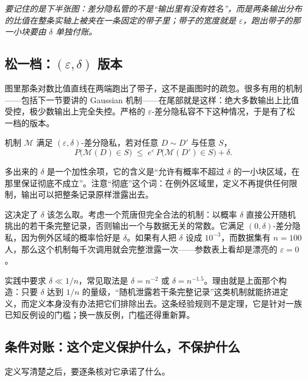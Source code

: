 \emph{要记住的是下半张图：差分隐私管的不是``输出里有没有姓名''，而是两条输出分布的比值在整条实轴上被夹在一条固定的带子里；带子的宽度就是 \(\varepsilon\)，跑出带子的那一小块要由 \(\delta\) 单独付账。}

\subsection{\texorpdfstring{松一档：\((\varepsilon,\delta)\) 版本}{松一档：(eps, delta) 版本}}

图里那条对数比值直线在两端跑出了带子，这不是画图时的疏忽。很多有用的机制——包括下一节要讲的 Gaussian 机制——在尾部就是这样：绝大多数输出上比值受控，极少数输出上完全失控。严格的 \(\varepsilon\)-差分隐私容不下这种情况，于是有了松一档的版本。

\begin{definition}
机制 \(\mathcal M\) 满足 \((\varepsilon,\delta)\)-差分隐私，若对任意 \(D\sim D'\) 与任意 \(S\)，
\[
P\big(\mathcal M(D)\in S\big)\;\le\;e^{\varepsilon}\,P\big(\mathcal M(D')\in S\big)+\delta.
\]
\end{definition}

多出来的 \(\delta\) 是一个加性余项，它的含义是``允许有概率不超过 \(\delta\) 的一小块区域，在那里保证彻底不成立''。注意``彻底''这个词：在例外区域里，定义不再提供任何限制，输出可以把整条记录原样泄露出去。

这决定了 \(\delta\) 该怎么取。考虑一个荒唐但完全合法的机制：以概率 \(\delta\) 直接公开随机挑出的若干条完整记录，否则输出一个与数据无关的常数。它满足 \((0,\delta)\)-差分隐私，因为例外区域的概率恰好是 \(\delta\)。如果有人把 \(\delta\) 设成 \(10^{-3}\)，而数据集有 \(n=100\) 人，那么这个机制每千次调用就会完整泄露一次——参数表上看却是漂亮的 \(\varepsilon=0\)。

\begin{remark}
实践中要求 \(\delta\ll 1/n\)，常见取法是 \(\delta=n^{-2}\) 或 \(\delta=n^{-1.5}\)。理由就是上面那个构造：只要 \(\delta\) 达到 \(1/n\) 的量级，``随机泄露若干条完整记录''这类机制就能挤进定义，而定义本身没有办法把它们排除出去。这条经验规则不是定理，它是针对一族已知反例设的门槛；换一族反例，门槛还得重新算。
\end{remark}

\subsection{条件对账：这个定义保护什么，不保护什么}

定义写清楚之后，要逐条核对它承诺了什么。

